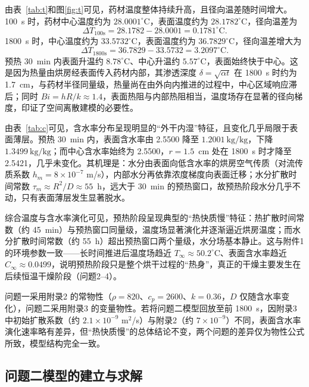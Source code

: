 \documentclass[12pt,a4paper]{article}
\begin{document}
由表~\ref{tab:t}和图\ref{fig:t}可见，药材温度整体持续升高，且径向温差随时间增大。100~s 时，药材中心温度约为 $28.0001^\circ\mathrm{C}$，表面温度约为 $28.1782^\circ\mathrm{C}$，径向温差为
\begin{equation}
\Delta T_{100\mathrm s}
=
28.1782-28.0001
=
0.1781^\circ\mathrm{C}.
\end{equation}
1800~s 时，中心温度约为 $33.5732^\circ\mathrm{C}$，表面温度约为 $36.7829^\circ\mathrm{C}$，径向温差增大为
\begin{equation}
\Delta T_{1800\mathrm s}
=
36.7829-33.5732
=
3.2097^\circ\mathrm{C}.
\end{equation}
预热 30~min 内表面升温约 $8.78^\circ\mathrm{C}$、中心升温约 $5.57^\circ\mathrm{C}$，表面始终快于中心。这是因为热量由烘房经表面传入药材内部，其渗透深度 $\delta=\sqrt{\alpha t}$ 在 1800~s 时约为 1.7~cm，与药材半径同量级，热量尚在由外向内推进的过程中，中心区域响应滞后；同时 $Bi=hR/k\approx1.4$，表面热阻与内部热阻相当，温度场存在显著的径向梯度，印证了空间离散建模的必要性。

由表~\ref{tab:c}可见，含水率分布呈现明显的``外干内湿''特征，且变化几乎局限于表面薄层。预热 30~min 内，表面含水率由 2.5500 降至 $1.2001\ \mathrm{kg/kg}$，下降 $1.3499\ \mathrm{kg/kg}$；而中心含水率始终为 2.5500，$r=1.5$~cm 处在 1800~s 时才降至 2.5421，几乎未变化。其机理是：水分由表面向低含水率的烘房空气传质（对流传质系数 $h_m=8\times10^{-7}$ m/s），内部水分再依靠浓度梯度向表面迁移；水分扩散时间常数 $\tau_m\approx R^2/D\approx55$~h，远大于 30~min 的预热窗口，故预热阶段水分几乎不动，只有表面薄层发生显著脱水。

综合温度与含水率演化可见，预热阶段呈现典型的``热快质慢''特征：热扩散时间常数（约 45~min）与预热窗口同量级，温度场显著演化并逐渐逼近烘房温度；而水分扩散时间常数（约 55~h）超出预热窗口两个量级，水分场基本静止。这与附件1 的环境参数一致——长时间推进后温度场趋近 $T_\infty\approx50.2^\circ\mathrm{C}$、表面含水率趋近 $C_\infty\approx0.0499$，说明预热阶段只是整个烘干过程的``热身''，真正的干燥主要发生在后续恒温干燥阶段（问题2--4）。

问题一采用附录2 的常物性（$\rho=820$、$c_p=2600$、$k=0.36$，$D$ 仅随含水率变化），问题二采用附录3 的变量物性。若将问题二模型回放至前 1800~s，因附录3 中初始扩散系数（约 $2.1\times10^{-9}$ m$^2$/s）与附录2（约 $7\times10^{-9}$）不同，表面含水率演化速率略有差异，但``热快质慢''的总体结论不变，两个问题的差异仅为物性公式所致，模型结构完全一致。


\subsection{问题二模型的建立与求解}
\end{document}
